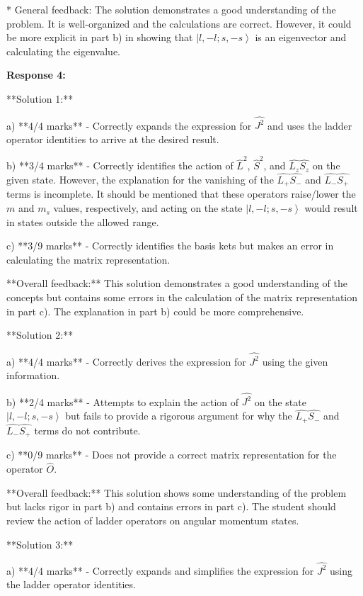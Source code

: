 \documentclass[a4paper,11pt]{article}
\begin{document}
* General feedback: The solution demonstrates a good understanding of the problem. It is well-organized and the calculations are correct. However, it could be more explicit in part b) in showing that \( \left|l, -l; s, -s \right> \) is an eigenvector and calculating the eigenvalue.

\textbf{Response 4:}

**Solution 1:**

a) **4/4 marks** - Correctly expands the expression for \( \hat{J^2} \) and uses the ladder operator identities to arrive at the desired result.

b) **3/4 marks** - Correctly identifies the action of \( \hat{L}^2 \), \( \hat{S}^2 \), and \( \hat{L_z}\hat{S_z} \) on the given state. However, the explanation for the vanishing of the \( \hat{L_+}\hat{S_-} \) and \( \hat{L_-}\hat{S_+} \) terms is incomplete. It should be mentioned that these operators raise/lower the \( m \) and \( m_s \) values, respectively, and acting on the state \( \left|l, -l; s, -s \right> \) would result in states outside the allowed range.

c) **3/9 marks** - Correctly identifies the basis kets but makes an error in calculating the matrix representation.

**Overall feedback:** This solution demonstrates a good understanding of the concepts but contains some errors in the calculation of the matrix representation in part c). The explanation in part b) could be more comprehensive.

**Solution 2:**

a) **4/4 marks** - Correctly derives the expression for \( \hat{J^2} \) using the given information.

b) **2/4 marks** - Attempts to explain the action of \( \hat{J^2} \) on the state \( \left|l, -l; s, -s \right> \) but fails to provide a rigorous argument for why the \( \hat{L_+}\hat{S_-} \) and \( \hat{L_-}\hat{S_+} \) terms do not contribute.

c) **0/9 marks** - Does not provide a correct matrix representation for the operator \( \hat{O} \).

**Overall feedback:** This solution shows some understanding of the problem but lacks rigor in part b) and contains errors in part c). The student should review the action of ladder operators on angular momentum states.

**Solution 3:**

a) **4/4 marks** - Correctly expands and simplifies the expression for \( \hat{J^2} \) using the ladder operator identities.
\end{document}
